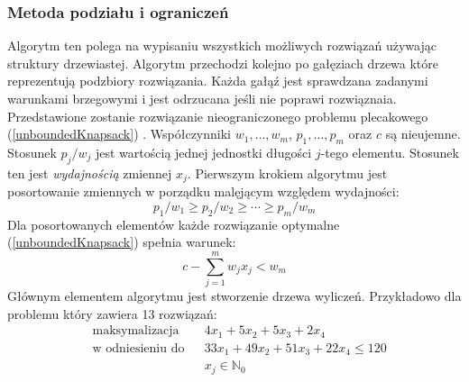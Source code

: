 \subsubsection{Metoda podziału i ograniczeń}
Algorytm ten polega na wypisaniu wszystkich możliwych rozwiązań używając struktury drzewiastej. Algorytm przechodzi kolejno po gałęziach drzewa które reprezentują podzbiory rozwiązania. Każda gałąź jest sprawdzana zadanymi warunkami brzegowymi i jest odrzucana jeśli nie poprawi rozwiąznaia. Przedstawione zostanie rozwiązanie nieograniczonego problemu plecakowego (\cref{unboundedKnapsack}) \cite{ChvatalBook}. Współczynniki $w_1,\dots,w_m$, $p_1, \dots, p_m$ oraz $c$ są nieujemne. Stosunek $p_j/w_j$ jest wartością jednej jednostki długości $j$-tego elementu. Stosunek ten jest \textit{wydajnością} zmiennej $x_j$. Pierwszym krokiem algorytmu jest posortowanie zmiennych w porządku malęjącym względem wydajności:
\begin{equation} \label{eq:BBeff}
  p_1/w_1 \ge p_2/w_2 \ge \cdots \ge p_m/w_m
\end{equation}
Dla posortowanych elementów każde rozwiązanie optymalne (\cref{unboundedKnapsack}) spełnia warunek:
\begin{equation}
  c - \sum_{j=1}^m w_jx_j < w_m
\end{equation}
Głównym elementem algorytmu jest stworzenie drzewa wyliczeń. Przykładowo dla problemu który zawiera 13 rozwiązań:
\begin{equation*}
  \begin{aligned}
    & \textrm{maksymalizacja} & &  4x_1 + 5x_2 + 5x_3 + 2x_4\\
    & \textrm{w odniesieniu do} & & 33x_1 + 49x_2 + 51x_3+22x_4 \le 120\\
    &&& x_j \in \mathbb{N}_0
  \end{aligned}
\end{equation*}

